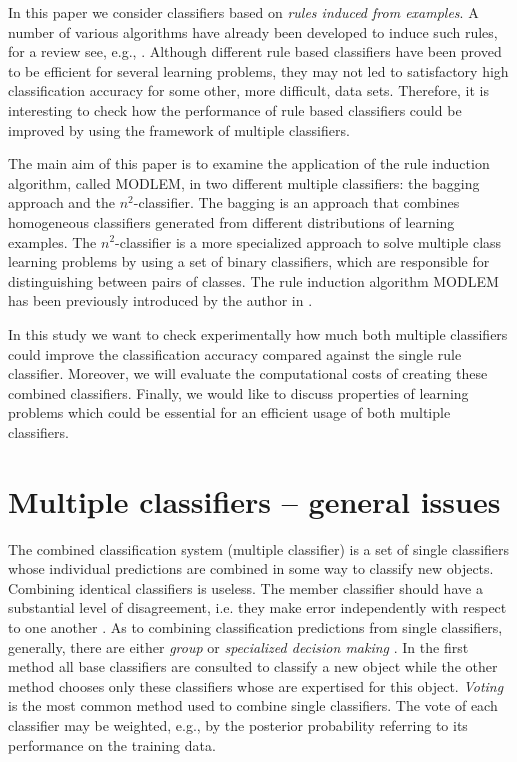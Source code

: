 \documentclass{llncs}
\begin{document}
In this paper we consider classifiers based on \emph{rules induced
from examples}. A number of various algorithms have already been
developed to induce such rules, for a review see, e.g.,
\cite{habcia,Zyt02}. Although different rule based classifiers
have been proved to be efficient for several learning problems,
they may not led to satisfactory high classification accuracy for
some other, more difficult, data sets. Therefore, it is
interesting to check how the performance of rule based classifiers
could be improved by using the framework of multiple classifiers.

The main aim of this paper is to examine the application of the
rule induction algorithm, called MODLEM, in two different multiple
classifiers: the bagging approach and the $n^2$-classifier. The
bagging is an approach that combines homogeneous classifiers
generated from different distributions of learning examples. The
$n^2$-classifier is a more specialized approach to solve multiple
class learning problems by using a set of binary classifiers,
which are responsible for distinguishing between pairs of classes.
The rule induction algorithm MODLEM has been previously introduced
by the author in \cite{modlem}.

In this study we want to check experimentally how much both
multiple classifiers could improve the classification accuracy
compared against the single rule classifier. Moreover, we will
evaluate the computational costs of creating these combined
classifiers. Finally, we would like to discuss properties of
learning problems which could be essential for an efficient usage
of both multiple classifiers.


\section{Multiple classifiers -- general issues}

The combined classification system (multiple classifier) is a set
of single classifiers whose individual predictions are combined in
some way to classify new objects.  Combining identical classifiers
is useless. The member classifier should have a substantial level
of disagreement, i.e. they make error independently with respect
to one another \cite{Dietrich}. As to combining classification
predictions from single classifiers, generally, there are either
{\em group} or {\em specialized decision making} \cite{Gama}. In
the first method all base classifiers are consulted to classify a
new object while the other method chooses only these classifiers
whose are expertised for this object. {\em Voting} is the most
common method used to combine single classifiers. The vote of each
classifier may be weighted, e.g., by the posterior probability
referring to its performance on the training data.
\end{document}
